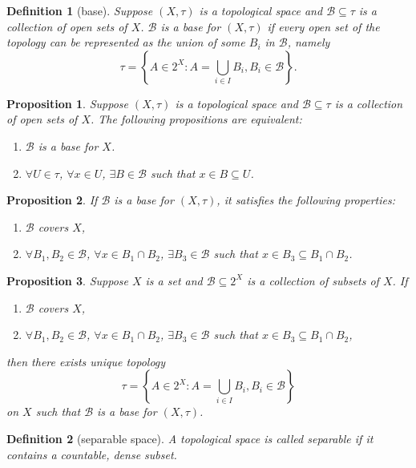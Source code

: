 \documentclass{report}
\newtheorem{definition}{Definition}[section]
\newtheorem{proposition}{Proposition}[section]
\theoremstyle{nonumberplain}
\begin{document}
\begin{definition}[base]
	Suppose $(X,\tau)$ is a topological space and $\mathcal{B}\subseteq \tau $ is a collection of open sets of $X$. $\mathcal{B}$ is a \emph{base} for $(X,\tau)$ if every open set of the topology can be represented as the union of some $B_i$ in $\mathcal{B}$, namely
	\[
		\tau=\left\{A\in 2^X:A=\bigcup_{i\in I} B_i,B_i\in\mathcal{B}\right\}.
	\]
\end{definition}
\begin{proposition}
	Suppose $(X,\tau)$ is a topological space and $\mathcal{B}\subseteq \tau $ is a collection of open sets of $X$. The following propositions are equivalent:
	\begin{enumerate}
		\item $\mathcal{B}$ is a base for $X$.
		\item $\forall U\in \tau$, $\forall x\in U$, $\exists B\in\mathcal{B}$ such that $x\in B\subseteq U$. 
	\end{enumerate}
\end{proposition}

\begin{proposition}
	If $\mathcal{B}$ is a base for $(X,\tau)$, it satisfies the following properties:
\begin{enumerate}
	\item $\mathcal{B}$ covers $X$,
	\item $\forall B_1,B_2\in\mathcal{B}$, $\forall x\in B_1\cap B_2$, $\exists B_3\in \mathcal{B}$ such that $x\in B_3\subseteq B_1\cap B_2$.
\end{enumerate}
\end{proposition}

\begin{proposition}
	Suppose $X$ is a set and $\mathcal{B}\subseteq 2^X $ is a collection of subsets of $X$. If
\begin{enumerate}
	\item $\mathcal{B}$ covers $X$,
	\item $\forall B_1,B_2\in\mathcal{B}$, $\forall x\in B_1\cap B_2$, $\exists B_3\in \mathcal{B}$ such that $x\in B_3\subseteq B_1\cap B_2$,
\end{enumerate}
then there exists unique topology
\[
	\tau=\left\{A\in 2^X:A=\bigcup_{i\in I} B_i,B_i\in\mathcal{B}\right\}
\]
on $X$ such that $\mathcal{B}$ is a base for $(X,\tau)$.
\end{proposition}

\begin{definition}[separable space]
	A topological space is called \emph{separable} if it contains a countable, dense subset.
\end{definition}
\end{document}
